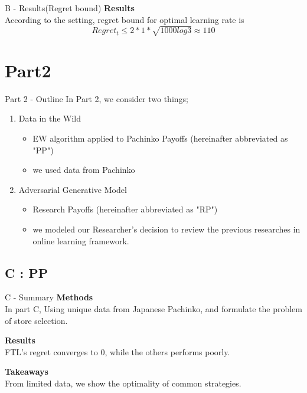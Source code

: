 \documentclass{beamer}
\begin{document}
\begin{frame}{B - Results(Regret bound)}
\textbf{Results}\\
    According to the setting, regret bound for optimal learning rate is
    \[
    Regret_t \leq 2 * 1 * \sqrt{1000log3} \approx 110
    \]
\end{frame}


\section{Part2}


\begin{frame}{Part 2 - Outline}
In Part 2, we consider two things;
\begin{enumerate}
    \item Data in the Wild
    \begin{itemize}
        \item EW algorithm applied to Pachinko Payoffs (hereinafter abbreviated as "PP")
        \item we used data from Pachinko
    \end{itemize}
    \item Adversarial Generative Model
    \begin{itemize}
        \item Research Payoffs (hereinafter abbreviated as "RP")
        \item we modeled our Researcher's decision to review the previous researches in online learning framework.
    \end{itemize}
\end{enumerate}
\end{frame}

\subsection{C : PP}

\begin{frame}{C - Summary}
\textbf{Methods}\\
In part C, Using unique data from Japanese Pachinko, and formulate the problem of store selection.  

\vspace{1em}
\textbf{Results}\\
FTL's regret converges to 0, while the others performs poorly.

\vspace{1em}
\textbf{Takeaways}\\
From limited data, we show the optimality of common strategies.
\end{frame}
\end{document}
